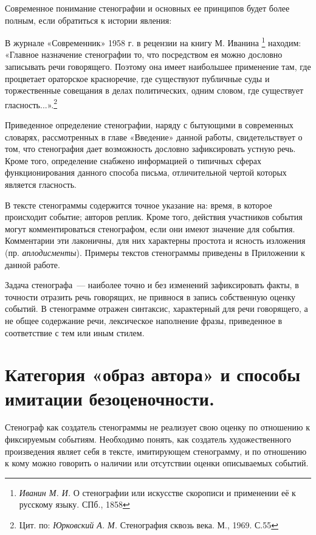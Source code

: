 \documentclass{kursa4}
\begin{document}
{      Современное понимание стенографии и основных ее принципов будет
      более полным, если обратиться к истории явления:

      В журнале «Современник» 1958 г. в рецензии на
      книгу М. Иванина \footnote{\textit{Иванин М. И. }О стенографии или искусстве скорописи и применении её к русскому языку. СПб., 1858} находим: «Главное назначение стенографии
      то, что посредством ея можно дословно записывать речи говорящего.
      Поэтому она имеет наибольшее применение там, где процветает ораторское
      красноречие, где существуют публичные суды и торжественные совещания в
      делах политических, одним словом, где существует
      гласность...».\footnote{{ Цит. по:
      }\textit{{Юрковский А. М.
      }}{Стенография сквозь века. М., 1969.
      С.55}}{ }

       Приведенное определение стенографии, наряду с бытующими в
      современных словарях, рассмотренных в главе «Введение» данной работы,
      свидетельствует о том, что стенография дает возможность дословно
      зафиксировать устную речь. Кроме того, определение снабжено
      информацией о типичных сферах функционирования данного способа
      письма, отличительной чертой которых является гласность. 

      В тексте стенограммы содержится точное указание на: время, в которое
      происходит событие; авторов реплик. Кроме того, действия участников
      события могут комментироваться стенографом, если они имеют значение для
      события. Комментарии эти лаконичны, для них характерны простота и
      ясность изложения (пр. \textit{аплодисменты}). Примеры текстов
      стенограммы приведены в Приложении к данной работе. 

      Задача стенографа~--- наиболее точно и без изменений зафиксировать
      факты, в точности отразить речь говорящих, не привнося в запись
      собственную оценку событий. В стенограмме отражен синтаксис,
      характерный для речи говорящего, а не общее содержание речи,
      лексическое наполнение фразы, приведенное в соответствие с тем или иным
      стилем. 

    \section{Категория «образ автора» и способы
    имитации безоценочности.}

      Стенограф как создатель стенограммы не реализует свою оценку по
      отношению к фиксируемым событиям. Необходимо понять, как создатель
      художественного произведения являет себя в тексте, имитирующем
      стенограмму, и по отношению к кому можно говорить о наличии или
      отсутствии оценки описываемых событий. 

}
\end{document}
